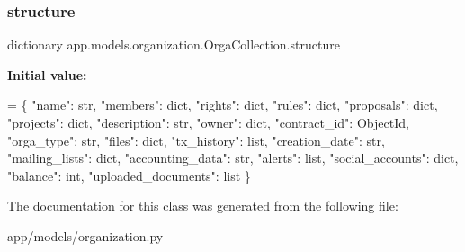 \subsubsection{\texorpdfstring{structure}{structure}}
{\footnotesize\ttfamily dictionary app.\+models.\+organization.\+Orga\+Collection.\+structure\hspace{0.3cm}{\ttfamily [static]}}

{\bfseries Initial value\+:}
\begin{DoxyCode}
=  \{
        \textcolor{stringliteral}{"name"}: str,
        \textcolor{stringliteral}{"members"}: dict,
        \textcolor{stringliteral}{"rights"}: dict,
        \textcolor{stringliteral}{"rules"}: dict,
        \textcolor{stringliteral}{"proposals"}: dict,
        \textcolor{stringliteral}{"projects"}: dict,
        \textcolor{stringliteral}{"description"}: str,
        \textcolor{stringliteral}{"owner"}: dict,
        \textcolor{stringliteral}{"contract\_id"}: ObjectId,
        \textcolor{stringliteral}{"orga\_type"}: str,
        \textcolor{stringliteral}{"files"}: dict,
        \textcolor{stringliteral}{"tx\_history"}: list,
        \textcolor{stringliteral}{"creation\_date"}: str,
        \textcolor{stringliteral}{"mailing\_lists"}: dict,
        \textcolor{stringliteral}{"accounting\_data"}: str,
        \textcolor{stringliteral}{"alerts"}: list,
        \textcolor{stringliteral}{"social\_accounts"}: dict,
        \textcolor{stringliteral}{"balance"}: int,
        \textcolor{stringliteral}{"uploaded\_documents"}: list
    \}
\end{DoxyCode}


The documentation for this class was generated from the following file\+:\begin{DoxyCompactItemize}
\item 
app/models/organization.\+py\end{DoxyCompactItemize}

